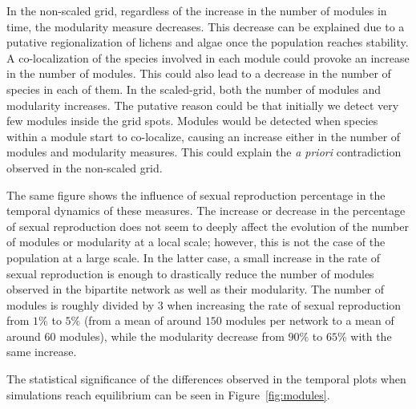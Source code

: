 \documentclass[fleqn,10pt]{wlscirep}
\begin{document}
In the non-scaled grid, regardless of the increase in the number of modules in time, the modularity measure decreases. This decrease can be explained due to a putative regionalization of lichens and algae once the population reaches stability. A co-localization of the species involved in each module could provoke an increase in the number of modules. This could also lead to a decrease in the number of species in each of them. In the scaled-grid, both the number of modules and modularity increases. The putative reason could be that initially we detect very few modules inside the grid spots. Modules would be detected when species within a module start to co-localize, causing an increase either in the number of modules and modularity measures. This could explain the \emph{a priori} contradiction observed in the non-scaled grid.

The same figure shows the influence of sexual reproduction percentage in the temporal dynamics of these measures. The increase or decrease in the percentage of sexual reproduction does not seem to deeply affect the evolution of the number of modules or modularity at a local scale; however, this is not the case of the population at a large scale. In the latter case, a small increase in the rate of sexual reproduction is enough to drastically reduce the number of modules observed in the bipartite network as well as their modularity. The number of modules is roughly divided by $3$ when increasing the rate of sexual reproduction from $1\%$ to $5\%$ (from a mean of around $150$ modules per network to a mean of around $60$ modules), while the modularity decrease from $90\%$ to $65\%$ with the same increase.

The statistical significance of the differences observed in the temporal plots when simulations reach equilibrium can be seen in Figure~\ref{fig:modules}.
\end{document}
